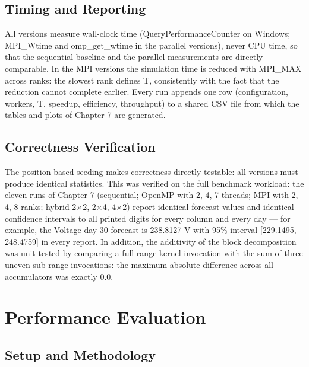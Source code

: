 \documentclass[12pt,a4paper]{article}
\begin{document}
\subsection{Timing and Reporting}

All versions measure wall-clock time (QueryPerformanceCounter on
Windows; MPI\_Wtime and omp\_get\_wtime in the parallel versions), never
CPU time, so that the sequential baseline and the parallel measurements
are directly comparable. In the MPI versions the simulation time is
reduced with MPI\_MAX across ranks: the slowest rank defines T,
consistently with the fact that the reduction cannot complete earlier.
Every run appends one row (configuration, workers, T, speedup,
efficiency, throughput) to a shared CSV file from which the tables and
plots of Chapter 7 are generated.

\subsection{Correctness Verification}

The position-based seeding makes correctness directly testable: all
versions must produce identical statistics. This was verified on the
full benchmark workload: the eleven runs of Chapter 7 (sequential;
OpenMP with 2, 4, 7 threads; MPI with 2, 4, 8 ranks; hybrid 2$\times$2, 2$\times$4,
4$\times$2) report identical forecast values and identical confidence intervals
to all printed digits for every column and every day --- for example,
the Voltage day-30 forecast is 238.8127 V with 95\% interval
[229.1495, 248.4759] in every report. In addition, the additivity of
the block decomposition was unit-tested by comparing a full-range kernel
invocation with the sum of three uneven sub-range invocations: the
maximum absolute difference across all accumulators was exactly 0.0.

\section{Performance Evaluation}

\subsection{Setup and Methodology}
\end{document}
